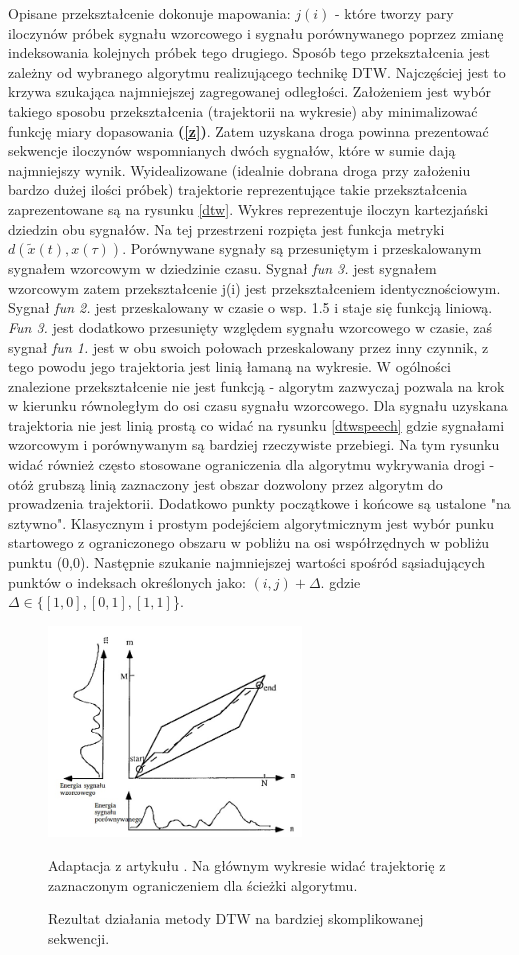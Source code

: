 Opisane przekształcenie dokonuje mapowania: $j(i)$ - które tworzy pary iloczynów próbek sygnału wzorcowego i sygnału porównywanego poprzez zmianę indeksowania kolejnych próbek tego drugiego. Sposób tego przekształcenia jest zależny od wybranego algorytmu realizującego technikę DTW. Najczęściej jest to krzywa szukająca najmniejszej zagregowanej odległości. Założeniem jest wybór takiego sposobu przekształcenia (trajektorii na wykresie) aby minimalizować funkcję miary dopasowania \textbf{(\ref{z})}. Zatem uzyskana droga powinna prezentować sekwencje iloczynów wspomnianych dwóch sygnałów, które w sumie dają najmniejszy wynik. Wyidealizowane (idealnie dobrana droga przy założeniu bardzo dużej ilości próbek) trajektorie reprezentujące takie przekształcenia zaprezentowane są na rysunku \ref{dtw}. Wykres reprezentuje iloczyn kartezjański dziedzin obu sygnałów. Na tej przestrzeni rozpięta jest funkcja metryki $d(\tilde{x}(t), x(\tau))$. Porównywane sygnały są przesuniętym i przeskalowanym sygnałem wzorcowym w dziedzinie czasu. Sygnał \textit{fun 3.} jest sygnałem wzorcowym zatem przekształcenie j(i) jest przekształceniem identycznościowym. Sygnał \textit{fun 2.} jest przeskalowany w czasie o wsp. 1.5 i staje się funkcją liniową. \textit{Fun 3.} jest dodatkowo przesunięty względem sygnału wzorcowego w czasie, zaś sygnał \textit{fun 1.} jest w obu swoich połowach przeskalowany przez inny czynnik, z tego powodu jego trajektoria jest linią łamaną na wykresie. W ogólności znalezione przekształcenie nie jest funkcją - algorytm zazwyczaj pozwala na krok w kierunku równoległym do osi czasu sygnału wzorcowego. Dla sygnału uzyskana trajektoria nie jest linią prostą co widać na rysunku \ref{dtwspeech} gdzie sygnałami wzorcowym i porównywanym są bardziej rzeczywiste przebiegi. Na tym rysunku widać również często stosowane ograniczenia dla algorytmu wykrywania drogi - otóż grubszą linią zaznaczony jest obszar dozwolony przez algorytm do prowadzenia trajektorii. Dodatkowo punkty początkowe i końcowe są ustalone "na sztywno". Klasycznym i prostym podejściem algorytmicznym jest wybór punku startowego z ograniczonego obszaru w pobliżu na osi współrzędnych w pobliżu punktu (0,0). Następnie szukanie najmniejszej wartości spośród sąsiadujących punktów o indeksach określonych jako: $(i, j) + \Delta.$ gdzie $ \Delta \in \{ [1,0], [0, 1], [1, 1]$\}. 
\begin{figure}[ht!]
  \centering
    \includegraphics[width=0.6\textwidth]{dtwspeech.jpg}
    \caption{Rezultat działania metody DTW na bardziej skomplikowanej sekwencji.} Adaptacja z artykułu \cite{campbell}. Na głównym wykresie widać trajektorię z zaznaczonym ograniczeniem dla ścieżki algorytmu.
\end{figure}
